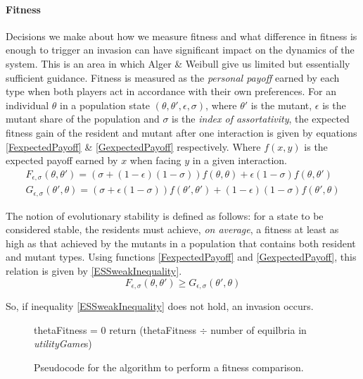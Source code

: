 \documentclass[11pt]{book}
\newcommand*{\np}{\par\noindent\newline}
\begin{document}
\paragraph{Fitness}
\np Decisions we make about how we measure fitness and what difference in fitness is enough to trigger an invasion can have significant impact on the dynamics of the system.
This is an area in which Alger \& Weibull give us limited but essentially sufficient guidance.
Fitness is measured as the \textit{personal payoff} earned by each type when both players act in accordance with their own preferences.
For an individual $\theta$ in a population state $(\theta, \theta', \epsilon,\sigma)$,
where $\theta'$ is the mutant, $\epsilon$ is the mutant share of the population and $\sigma$ is the \textit{index of assortativity}, the expected fitness gain of the resident and mutant after one interaction is given by equations \ref{FexpectedPayoff} \& \ref{GexpectedPayoff} respectively.
Where $f(x, y)$ is the expected payoff earned by $x$ when facing $y$ in a given interaction.
\newline
\begin{gather}
	\label{FexpectedPayoff}
	F_{\epsilon, \sigma}(\theta, \theta') = (\sigma +(1-\epsilon)(1-\sigma))f(\theta, \theta) + \epsilon(1-\sigma)f(\theta, \theta')\\
	\label{GexpectedPayoff}
	G_{\epsilon, \sigma}(\theta', \theta) = (\sigma +\epsilon(1-\sigma))f(\theta', \theta') + (1-\epsilon)(1-\sigma)f(\theta', \theta)
\end{gather}

\np The notion of evolutionary stability is defined as follows: for a state to be considered stable, the residents must achieve, \textit{on average}, a fitness at least as high as that achieved by the mutants in a population that contains both resident and mutant types.
Using functions \ref{FexpectedPayoff} and \ref{GexpectedPayoff}, this relation is given by \ref{ESSweakInequality}.
\begin{equation}
	\label{ESSweakInequality}
	F_{\epsilon, \sigma}(\theta, \theta') \geq G_{\epsilon, \sigma}(\theta', \theta)
\end{equation}
\citet[~p. 44]{alger_generalization_2012}
\np So, if inequality \ref{ESSweakInequality} does not hold, an invasion occurs.

\begin{figure}[H]
	\centering
	\begin{algorithm}[H]
		thetaFitness = 0\;
		return (thetaFitness $\div$ number of equilbria in \textit{utilityGame}s)\;
	   \end{algorithm}
	\caption{Pseudocode for the algorithm to perform a fitness comparison.}
	\label{psuedocodeForf}
\end{figure}
\end{document}
